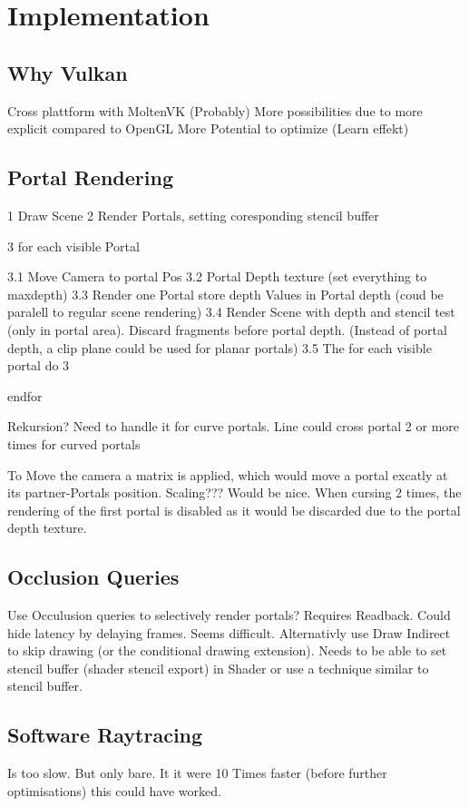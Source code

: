 \section{Implementation}
\subsection{Why Vulkan}
Cross plattform with MoltenVK
(Probably) More possibilities due to more explicit compared to OpenGL
More Potential to optimize
(Learn effekt)

\subsection{Portal Rendering}
1 Draw Scene
2 Render Portals, setting coresponding stencil buffer

3 for each visible Portal

3.1 Move Camera to portal Pos
3.2 Portal Depth texture (set everything to maxdepth)
3.3 Render one Portal store depth Values in Portal depth (coud be paralell to regular scene rendering)
3.4 Render Scene with depth and stencil test (only in portal area). Discard fragments before portal depth.
(Instead of portal depth, a clip plane could be used for planar portals)
3.5 The for each visible portal do 3

endfor

Rekursion? Need to handle it for curve portals. Line could cross portal 2 or more times for curved portals


To Move the camera a matrix is applied, which would move a portal excatly at its partner-Portals position. Scaling??? Would be nice.
When cursing 2 times, the rendering of the first portal is disabled as it would be discarded due to the portal depth texture.

\subsection{Occlusion Queries}
Use Occulusion queries to selectively render portals? Requires Readback. Could hide latency by delaying frames. Seems difficult.
Alternativly use Draw Indirect to skip drawing (or the conditional drawing extension). Needs to be able to set stencil buffer (shader stencil export) in Shader or use a technique similar to stencil buffer.


\subsection{Software Raytracing}
Is too slow. But only bare. It it were 10 Times faster (before further optimisations) this could have worked.


